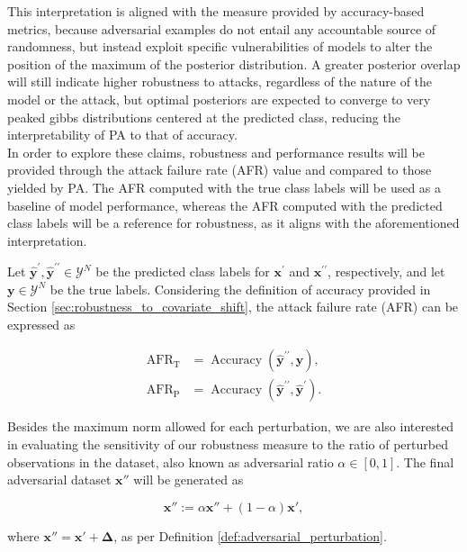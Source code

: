 This interpretation is aligned with the measure provided by accuracy-based metrics, 
because adversarial examples do not entail any accountable source of randomness, 
but instead exploit specific vulnerabilities of models to alter the position of the 
maximum of the posterior distribution. A greater posterior overlap will still
indicate higher robustness to attacks, regardless of the nature of the model or the
attack, but optimal posteriors are expected to converge to very peaked gibbs
distributions centered at the predicted class, reducing the interpretability of PA
to that of accuracy. \\

In order to explore these claims, robustness and performance results will be
provided through the attack failure rate (AFR) value and compared to those
yielded by PA. The AFR computed with the true class labels will be used as a baseline
of model performance, whereas the AFR computed with the predicted class labels
will be a reference for robustness, as it aligns with the aforementioned
interpretation.

\begin{definition}
    Let $\bm{\hat{y}^\prime}, \bm{\hat{y}^{\prime\prime}} \in \mathcal{Y}^N$ be the predicted class 
    labels for $\bm{x}^\prime$ and $\bm{x}^{\prime \prime}$, respectively, 
    and let $\bm{y}\in \mathcal{Y}^N$ be the true labels. Considering the definition of accuracy
    provided in Section \ref{sec:robustness_to_covariate_shift}, the attack failure rate (AFR)
    can be expressed as

    $$
    \begin{aligned}
        \operatorname{AFR}_\text{T} &= \operatorname{Accuracy}(\bm{\hat{y}^{\prime \prime}}, \bm{y}), \\
        \operatorname{AFR}_\text{P} &= \operatorname{Accuracy}(\bm{\hat{y}^{\prime \prime}}, \bm{\hat{y}^{\prime}}).
    \end{aligned}
    $$

\end{definition}

\begin{definition}
    Besides the maximum norm allowed for each perturbation, we are also interested in evaluating 
    the sensitivity of our robustness measure to the ratio of perturbed observations in the dataset, 
    also known as adversarial ratio $\alpha \in [0,1]$. The final adversarial dataset $\bm{x}''$ will be generated as

    $$
    \bm{x}'' := \alpha \bm{x}'' + (1 - \alpha) \bm{x}',
    $$

    where $\bm{x}'' = \bm{x}' + \bm{\Delta}$, as per Definition \ref{def:adversarial_perturbation}.
\end{definition}

